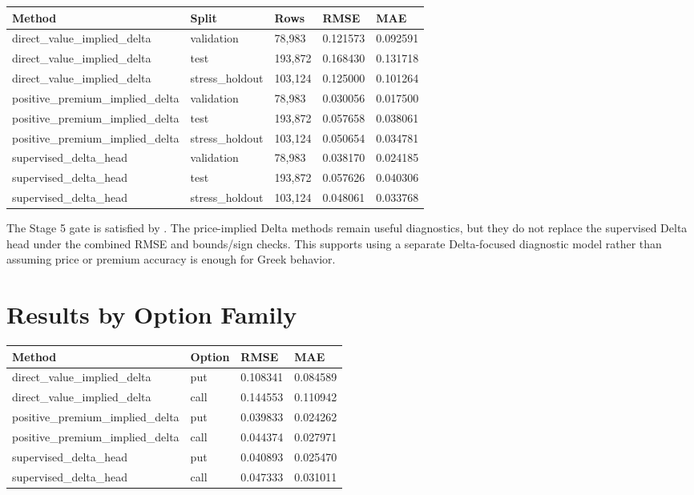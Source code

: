 \documentclass[11pt,a4paper]{article}
\newcommand{\code}[1]{\path{#1}}
\begin{document}
\begin{longtable}{L{0.26\textwidth} L{0.16\textwidth} L{0.16\textwidth} L{0.16\textwidth} L{0.16\textwidth}}
\toprule
Method & Split & Rows & RMSE & MAE \\
\midrule
\endhead
direct\_value\_implied\_delta & validation & 78,983 & 0.121573 & 0.092591 \\
direct\_value\_implied\_delta & test & 193,872 & 0.168430 & 0.131718 \\
direct\_value\_implied\_delta & stress\_holdout & 103,124 & 0.125000 & 0.101264 \\
positive\_premium\_implied\_delta & validation & 78,983 & 0.030056 & 0.017500 \\
positive\_premium\_implied\_delta & test & 193,872 & 0.057658 & 0.038061 \\
positive\_premium\_implied\_delta & stress\_holdout & 103,124 & 0.050654 & 0.034781 \\
supervised\_delta\_head & validation & 78,983 & 0.038170 & 0.024185 \\
supervised\_delta\_head & test & 193,872 & 0.057626 & 0.040306 \\
supervised\_delta\_head & stress\_holdout & 103,124 & 0.048061 & 0.033768 \\
\bottomrule
\end{longtable}

The Stage 5 gate is satisfied by \code{supervised_delta_head}. The price-implied Delta methods remain useful diagnostics, but they do not replace the supervised Delta head under the combined RMSE and bounds/sign checks. This supports using a separate Delta-focused diagnostic model rather than assuming price or premium accuracy is enough for Greek behavior.

\section{Results by Option Family}

\begin{longtable}{L{0.28\textwidth} L{0.14\textwidth} L{0.16\textwidth} L{0.16\textwidth}}
\toprule
Method & Option & RMSE & MAE \\
\midrule
\endhead
direct\_value\_implied\_delta & put & 0.108341 & 0.084589 \\
direct\_value\_implied\_delta & call & 0.144553 & 0.110942 \\
positive\_premium\_implied\_delta & put & 0.039833 & 0.024262 \\
positive\_premium\_implied\_delta & call & 0.044374 & 0.027971 \\
supervised\_delta\_head & put & 0.040893 & 0.025470 \\
supervised\_delta\_head & call & 0.047333 & 0.031011 \\
\bottomrule
\end{longtable}
\end{document}
